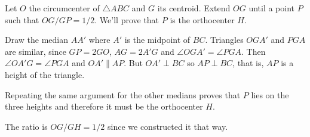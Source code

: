 \documentclass[12pt]{article}
\begin{document}
Let $O$ the circumcenter of $\triangle ABC$ and $G$ its centroid. Extend $OG$ until  a point $P$ such that $OG/GP=1/2$. We'll prove that $P$ is the orthocenter $H$.
\medskip

Draw the median $AA'$ where $A'$ is the midpoint of $BC$. Triangles $OGA'$ and $PGA$ are similar, since $GP=2GO$, $AG=2A'G$ and $\angle OGA'=\angle PGA$. Then $\angle OA'G =\angle PGA$ and $OA'\parallel AP$. But $OA'\perp BC$ so $AP\perp BC$, that is, $AP$ is a height of the triangle.\smallskip

Repeating the same argument for the other medians proves that $P$ lies on the three heights and therefore it must be the orthocenter $H$.\smallskip

The ratio is $OG/GH=1/2$ since we constructed it that way.\medskip


\end{document}
